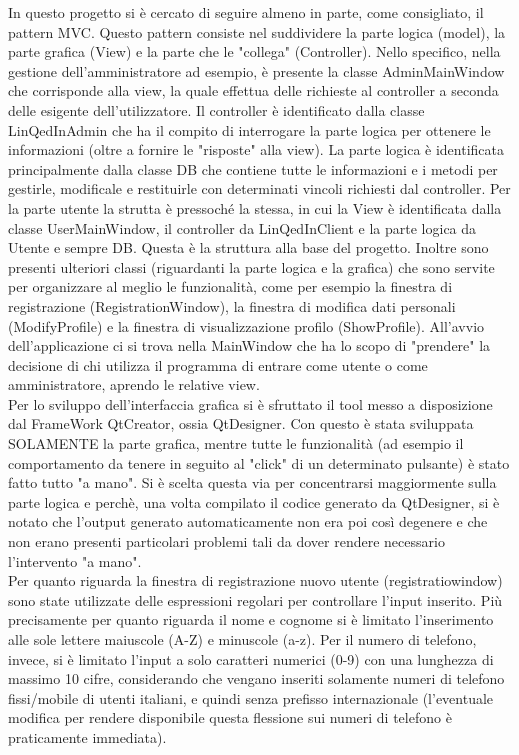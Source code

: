\documentclass[openany, a4paper,11pt] {report}
\begin{document}
In questo progetto si è cercato di seguire almeno in parte, come consigliato, il pattern MVC. Questo pattern consiste nel suddividere la parte logica (\textsf{model}), la parte grafica (\textsf{View}) e la parte che le "collega" (\textsf{Controller}).
Nello specifico, nella gestione dell'amministratore ad esempio, è presente la classe \textsf{AdminMainWindow} che corrisponde alla view, la quale effettua delle richieste al controller a seconda delle esigente dell'utilizzatore. Il controller è identificato dalla classe \textsf{LinQedInAdmin} che ha il compito di interrogare la parte logica per ottenere le informazioni  (oltre a fornire le "risposte" alla view). La parte logica è identificata principalmente dalla classe \textsf{DB} che contiene tutte le informazioni e i metodi per gestirle, modificale e restituirle con determinati vincoli richiesti dal controller.
Per la parte utente la strutta è pressoché la stessa, in cui la View è identificata dalla classe \textsf{UserMainWindow}, il controller da \textsf{LinQedInClient} e la parte logica da \textsf{Utente} e sempre \textsf{DB}.
Questa è la struttura alla base del progetto. Inoltre sono presenti ulteriori classi (riguardanti la parte logica e la grafica) che sono servite per organizzare al meglio le funzionalità, come per esempio la finestra di registrazione (\textsf{RegistrationWindow}), la finestra di modifica dati personali (\textsf{ModifyProfile}) e la finestra di visualizzazione profilo (\textsf{ShowProfile}). All'avvio dell'applicazione ci si trova nella \textsf{MainWindow} che ha lo scopo di "prendere" la decisione di chi utilizza il programma di entrare come utente o come amministratore, aprendo le relative view.\\
Per lo sviluppo dell'interfaccia grafica si è sfruttato il tool messo a disposizione dal FrameWork QtCreator, ossia QtDesigner. Con questo è stata sviluppata SOLAMENTE la parte grafica, mentre tutte le funzionalità (ad esempio il comportamento da tenere in seguito al "click" di un determinato pulsante) è stato fatto tutto "a mano". Si è scelta questa via per concentrarsi maggiormente sulla parte logica e perchè, una volta compilato il codice generato da QtDesigner, si è notato che l'output generato automaticamente non era poi così degenere e che non erano presenti particolari problemi tali da dover rendere necessario l'intervento "a mano".\\
Per quanto riguarda la finestra di registrazione nuovo utente (\textsf{registratiowindow}) sono state utilizzate delle espressioni regolari per controllare l'input inserito. Più precisamente per quanto riguarda il \textsf{nome} e \textsf{cognome} si è limitato l'inserimento alle sole lettere maiuscole (A-Z) e minuscole (a-z). Per il numero di telefono, invece, si è limitato l'input a solo caratteri numerici (0-9) con una lunghezza di massimo 10 cifre, considerando che vengano inseriti solamente numeri di telefono fissi/mobile di utenti italiani, e quindi senza prefisso internazionale (l'eventuale modifica per rendere disponibile questa flessione sui numeri di telefono è praticamente immediata).
\end{document}
